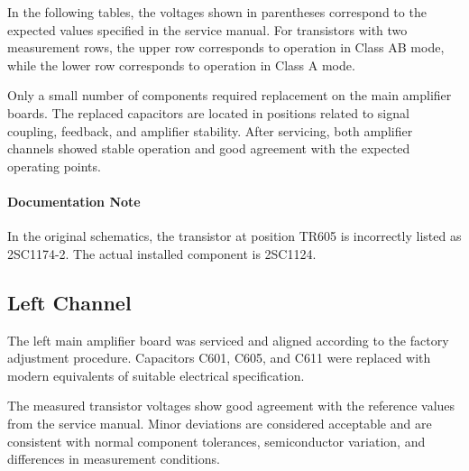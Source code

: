 \documentclass[]{article}
\begin{document}
In the following tables, the voltages shown in parentheses correspond to the expected values specified in the service manual. For transistors with two measurement rows, the upper row corresponds to operation in Class AB mode, while the lower row corresponds to operation in Class A mode.

Only a small number of components required replacement on the main amplifier boards. The replaced capacitors are located in positions related to signal coupling, feedback, and amplifier stability. After servicing, both amplifier channels showed stable operation and good agreement with the expected operating points.

\paragraph{Documentation Note}
In the original schematics, the transistor at position TR605 is incorrectly listed as 2SC1174-2. The actual installed component is 2SC1124.

\subsection{Left Channel}

The left main amplifier board was serviced and aligned according to the factory adjustment procedure. Capacitors C601, C605, and C611 were replaced with modern equivalents of suitable electrical specification.

The measured transistor voltages show good agreement with the reference values from the service manual. Minor deviations are considered acceptable and are consistent with normal component tolerances, semiconductor variation, and differences in measurement conditions.
\end{document}
